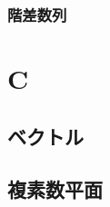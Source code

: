 \documentclass[10pt,dvipdfmx]{jsarticle}
\begin{document}
\subsubsection*{階差数列}


\section*{C}
\subsection*{ベクトル}
\subsection*{複素数平面}
\end{document}
